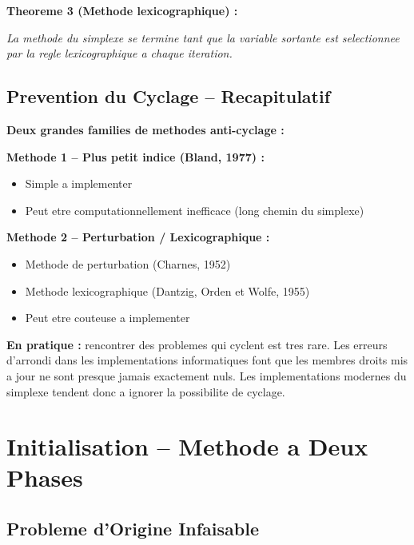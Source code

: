 \documentclass[12pt,a4paper]{article}
\begin{document}
\begin{theoreme}
\textbf{Theoreme 3 (Methode lexicographique) :}

\textit{La methode du simplexe se termine tant que la variable sortante est selectionnee par la \textcolor{defvert}{regle lexicographique} a chaque iteration.}
\end{theoreme}

\newpage
\subsection{Prevention du Cyclage -- Recapitulatif}

\begin{important}
\textbf{Deux grandes families de methodes anti-cyclage :}

\textbf{Methode 1 -- Plus petit indice (Bland, 1977) :}
\begin{itemize}
    \item Simple a implementer
    \item Peut etre computationnellement inefficace (long chemin du simplexe)
\end{itemize}

\textbf{Methode 2 -- Perturbation / Lexicographique :}
\begin{itemize}
    \item Methode de perturbation (Charnes, 1952)
    \item Methode lexicographique (Dantzig, Orden et Wolfe, 1955)
    \item Peut etre couteuse a implementer
\end{itemize}

\textcolor{defvert}{\textbf{En pratique :}} rencontrer des problemes qui cyclent est tres rare. Les erreurs d'arrondi dans les implementations informatiques font que les membres droits mis a jour ne sont presque jamais exactement nuls. Les implementations modernes du simplexe tendent donc a ignorer la possibilite de cyclage.
\end{important}

\section{Initialisation -- Methode a Deux Phases}

\subsection{Probleme d'Origine Infaisable}
\end{document}
